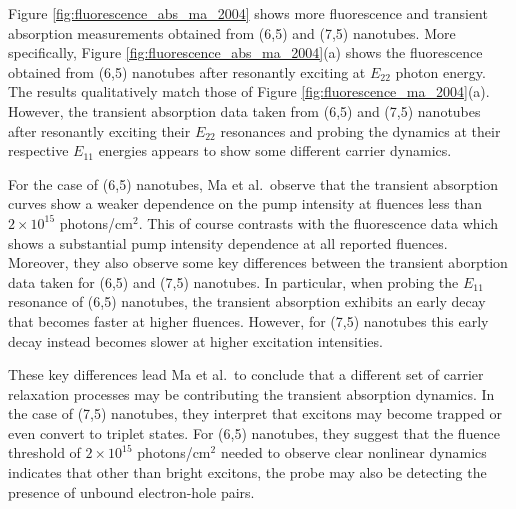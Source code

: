 Figure \ref{fig:fluorescence_abs_ma_2004} shows more fluorescence and transient absorption measurements obtained from (6,5) and (7,5) nanotubes. More specifically, Figure \ref{fig:fluorescence_abs_ma_2004}(a) shows the fluorescence obtained from (6,5) nanotubes after resonantly exciting at $E_{22}$ photon energy. The results qualitatively match those of Figure \ref{fig:fluorescence_ma_2004}(a). However, the transient absorption data taken from (6,5) and (7,5) nanotubes after resonantly exciting their $E_{22}$ resonances and probing the dynamics at their respective $E_{11}$ energies appears to show some different carrier dynamics.

For the case of (6,5) nanotubes, Ma et al.\ observe that the transient absorption curves show a weaker dependence on the pump intensity at fluences less than $2 \times 10^{15}$ photons/cm$^2$. This of course contrasts with the fluorescence data which shows a substantial pump intensity dependence at all reported fluences. Moreover, they also observe some key differences between the transient aborption data taken for (6,5) and (7,5) nanotubes. In particular, when probing the $E_{11}$ resonance of (6,5) nanotubes, the transient absorption exhibits an early decay that becomes faster at higher fluences. However, for (7,5) nanotubes this early decay instead becomes slower at higher excitation intensities.

These key differences lead Ma et al.\ to conclude that a different set of carrier relaxation processes may be contributing the transient absorption dynamics. In the case of (7,5) nanotubes, they interpret that excitons may become trapped or even convert to triplet states. For (6,5) nanotubes, they suggest that the fluence threshold of $2 \times 10^{15}$ photons/cm$^2$ needed to observe clear nonlinear dynamics indicates that other than bright excitons, the probe may also be detecting the presence of unbound electron-hole pairs.

